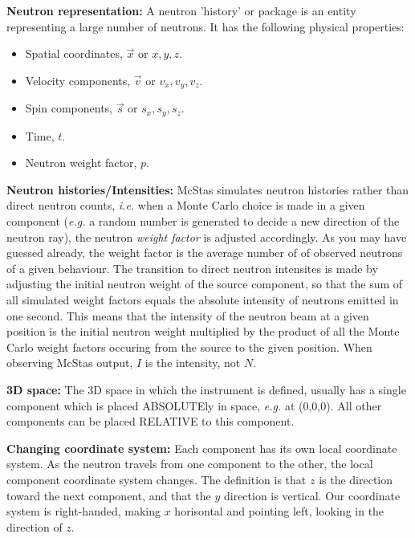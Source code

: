 \begin{itemize}
\item{{\bf Neutron representation:} A neutron 'history' or package is
  an entity representing a large number of neutrons. It has the
  following physical properties:
  \begin{itemize}
    \item{Spatial coordinates, $\vec{x}$ or $x,y,z$.}
    \item{Velocity components, $\vec{v}$ or $v_x,v_y,v_z$.}
    \item{Spin components, $\vec{s}$ or $s_x,s_y,s_z$.}
    \item{Time, $t$.}
    \item{Neutron weight factor, $p$.}
  \end{itemize}
\item{{\bf Neutron histories/Intensities:} McStas simulates neutron
    histories rather than direct neutron counts, \emph{i.e.} when a
    Monte Carlo choice is made in a given component (\emph{e.g.} a random
    number is generated to decide a new direction of the neutron ray), 
    the neutron \emph{weight factor} is adjusted accordingly. As you
    may have guessed already, the weight factor is the 
    average number of of observed neutrons of a given behaviour.
    The transition to direct neutron intensites is made
    by adjusting the initial neutron weight of the source component,
    so that the sum of all simulated weight factors equals the
    absolute intensity of neutrons emitted in one
    second. This means that the intensity of the neutron beam at a
    given position is the initial neutron weight multiplied by the 
    product of all the Monte Carlo weight factors occuring from the
    source to the given position.  When observing McStas output, $I$
    is the intensity, not $N$.}
\item{{\bf 3D space:} The 3D space in which the instrument is defined,
  usually has a single component which is
  placed ABSOLUTEly  in space, \emph{e.g.} at (0,0,0). All other components
  can be placed RELATIVE to this component.}
\item{{\bf Changing coordinate system:} Each component has its own
    local coordinate system. As the neutron travels from one component
    to the other, the local component coordinate system changes. The
    definition is that $z$ is the direction toward the next component,
    and that the $y$ direction is vertical. Our coordinate system is 
    right-handed, making $x$ horisontal and pointing left, looking in 
    the direction of $z$.}
}
\end{itemize}
